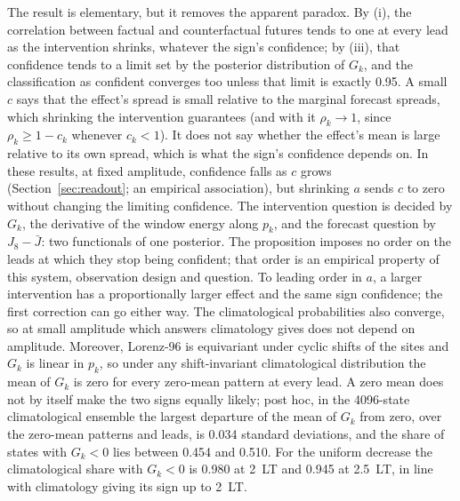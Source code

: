 \documentclass[11pt]{article}
\newcommand{\Jbar}{\bar J}
\begin{document}
The result is elementary, but it removes the apparent paradox. By (i), the correlation between factual and counterfactual futures tends to one at every lead as the intervention shrinks, whatever the sign's confidence; by (iii), that confidence tends to a limit set by the posterior distribution of $G_k$, and the classification as confident converges too unless that limit is exactly 0.95. A small $c$ says that the effect's spread is small relative to the marginal forecast spreads, which shrinking the intervention guarantees (and with it $\rho_k \to 1$, since $\rho_k \ge 1 - c_k$ whenever $c_k < 1$). It does not say whether the effect's mean is large relative to its own spread, which is what the sign's confidence depends on. In these results, at fixed amplitude, confidence falls as $c$ grows (Section~\ref{sec:readout}; an empirical association), but shrinking $a$ sends $c$ to zero without changing the limiting confidence. The intervention question is decided by $G_k$, the derivative of the window energy along $p_k$, and the forecast question by $J_8 - \Jbar$: two functionals of one posterior. The proposition imposes no order on the leads at which they stop being confident; that order is an empirical property of this system, observation design and question. To leading order in $a$, a larger intervention has a proportionally larger effect and the same sign confidence; the first correction can go either way. The climatological probabilities also converge, so at small amplitude which answers climatology gives does not depend on amplitude. Moreover, Lorenz-96 is equivariant under cyclic shifts of the sites and $G_k$ is linear in $p_k$, so under any shift-invariant climatological distribution the mean of $G_k$ is zero for every zero-mean pattern at every lead. A zero mean does not by itself make the two signs equally likely; post hoc, in the 4096-state climatological ensemble the largest departure of the mean of $G_k$ from zero, over the zero-mean patterns and leads, is 0.034 standard deviations, and the share of states with $G_k < 0$ lies between 0.454 and 0.510. For the uniform decrease the climatological share with $G_k < 0$ is 0.980 at 2~LT and 0.945 at 2.5~LT, in line with climatology giving its sign up to 2~LT.
\end{document}
